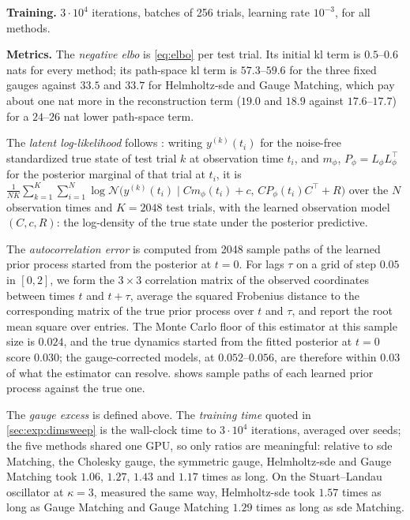 \documentclass{article} %
\newcommand{\Norm}{\mathcal{N}}
\begin{document}
\textbf{Training.} $3 \cdot 10^4$ iterations, batches of 256 trials, learning rate $10^{-3}$, for all methods.

\textbf{Metrics.} The \emph{negative \gls{elbo}} is \cref{eq:elbo} per test trial. Its initial \gls{kl} term is $0.5$--$0.6$ nats for every method; its path-space \gls{kl} term is $57.3$--$59.6$ for the three fixed gauges against $33.5$ and $33.7$ for Helmholtz-\gls{sde} and Gauge Matching, which pay about one nat more in the reconstruction term ($19.0$ and $18.9$ against $17.6$--$17.7$) for a $24$--$26$ nat lower path-space term.

The \emph{latent log-likelihood} follows \citet{smith2026closing}: writing $y^{(k)}(t_i)$ for the noise-free standardized true state of test trial $k$ at observation time $t_i$, and $m_\phi$, $P_\phi = L_\phi L_\phi^\top$ for the posterior marginal of that trial at $t_i$, it is $\frac{1}{N K} \sum_{k=1}^{K} \sum_{i=1}^{N} \log \Norm\bigl(y^{(k)}(t_i) \mid C m_\phi(t_i) + c, \, C P_\phi(t_i) C^\top + R\bigr)$ over the $N$ observation times and $K = 2048$ test trials, with the learned observation model $(C, c, R)$: the log-density of the true state under the posterior predictive.

The \emph{autocorrelation error} is computed from 2048 sample paths of the learned prior process started from the posterior at $t = 0$. For lags $\tau$ on a grid of step $0.05$ in $[0, 2]$, we form the $3 \times 3$ correlation matrix of the observed coordinates between times $t$ and $t + \tau$, average the squared Frobenius distance to the corresponding matrix of the true prior process over $t$ and $\tau$, and report the root mean square over entries. The Monte Carlo floor of this estimator at this sample size is $0.024$, and the true dynamics started from the fitted posterior at $t = 0$ score $0.030$; the gauge-corrected models, at $0.052$--$0.056$, are therefore within $0.03$ of what the estimator can resolve.  shows sample paths of each learned prior process against the true one.

The \emph{gauge excess} is defined above. The \emph{training time} quoted in \cref{sec:exp:dimsweep} is the wall-clock time to $3 \cdot 10^4$ iterations, averaged over seeds; the five methods shared one GPU, so only ratios are meaningful: relative to \gls{sde} Matching, the Cholesky gauge, the symmetric gauge, Helmholtz-\gls{sde} and Gauge Matching took $1.06$, $1.27$, $1.43$ and $1.17$ times as long. On the Stuart--Landau oscillator at $\kappa = 3$, measured the same way, Helmholtz-\gls{sde} took $1.57$ times as long as Gauge Matching and Gauge Matching $1.29$ times as long as \gls{sde} Matching.
\end{document}
